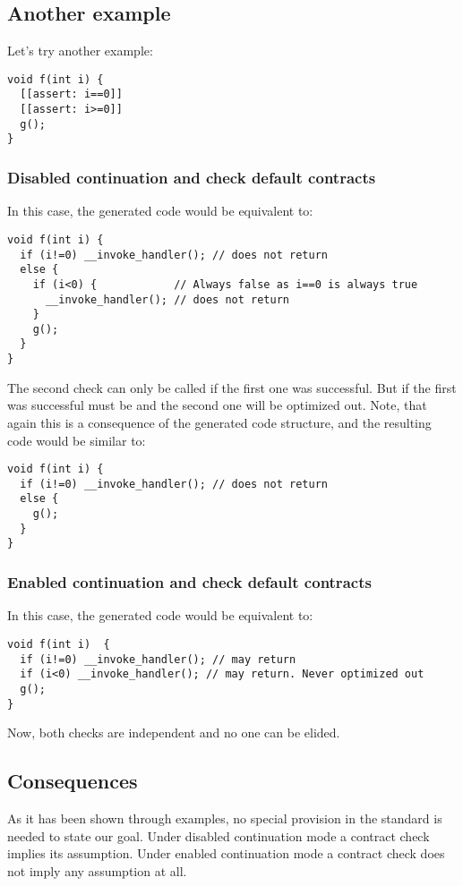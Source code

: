 \subsection{Another example}

Let's try another example:

\begin{lstlisting}
void f(int i) {
  [[assert: i==0]]
  [[assert: i>=0]]
  g();
}
\end{lstlisting}

\subsubsection{Disabled continuation and check default contracts}

In this case, the generated code would be equivalent to:

\begin{lstlisting}
void f(int i) {
  if (i!=0) __invoke_handler(); // does not return
  else {
    if (i<0) {            // Always false as i==0 is always true
      __invoke_handler(); // does not return
    }
    g();
  }
}
\end{lstlisting}

The second check can only be called if the first one was successful.
But if the first was successful  must be  and the second
one will be optimized out. Note, that again this is a consequence of the 
generated code structure, and the resulting code would be similar to:

\begin{lstlisting}
void f(int i) {
  if (i!=0) __invoke_handler(); // does not return
  else {
    g();
  }
}
\end{lstlisting}


\subsubsection{Enabled continuation and check default contracts}

In this case, the generated code would be equivalent to:

\begin{lstlisting}
void f(int i)  {
  if (i!=0) __invoke_handler(); // may return
  if (i<0) __invoke_handler(); // may return. Never optimized out
  g();
}
\end{lstlisting}

Now, both checks are independent and no one can be elided.

\subsection{Consequences}

As it has been shown through examples, no special provision in the standard is
needed to state our goal. Under disabled continuation mode a contract check implies
its assumption. Under enabled continuation mode a contract check does not imply
any assumption at all.

